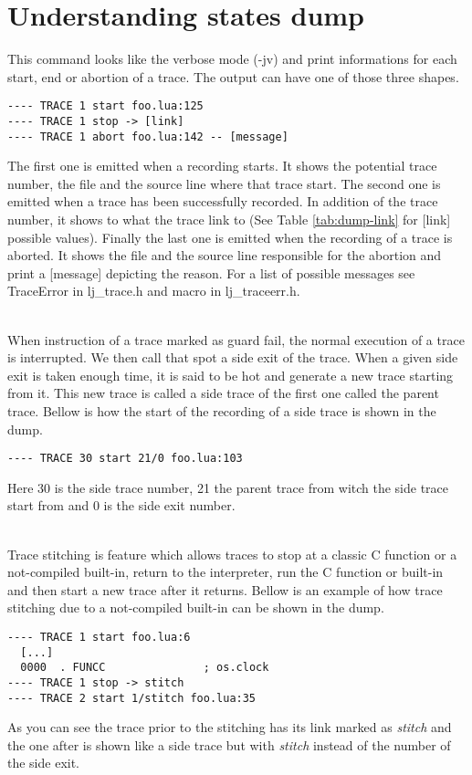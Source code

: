 \section{Understanding states dump}
\label{Sec:dump-states}
This command looks like the verbose mode (-jv) and print informations for each start,
end or abortion of a trace. The output can have one of those three shapes.
\begin{verbatim}
---- TRACE 1 start foo.lua:125
---- TRACE 1 stop -> [link]
---- TRACE 1 abort foo.lua:142 -- [message]
\end{verbatim}
The first one is emitted when a recording starts. It shows the potential
trace number, the file and the source line where that trace start.
The second one is emitted when a trace has been successfully recorded. In
addition of the trace number, it shows to what the trace link to (See Table
\ref{tab:dump-link} for [link] possible values). Finally the last one is emitted
when the recording of a trace is aborted. It shows the file and the source line
responsible for the abortion and print a [message] depicting the reason. For
a list of possible messages see TraceError in lj\_trace.h and macro in
lj\_traceerr.h.

\\
When instruction of a trace marked as guard fail, the normal execution of a
trace is interrupted. We then call that spot a side exit of the trace. When a
given side exit is taken enough time, it is said to be hot and generate a new
trace starting from it. This new trace is called a side trace of the first one
called the parent trace. Bellow is how the start of the recording of a side
trace is shown in the dump.
\begin{verbatim}
---- TRACE 30 start 21/0 foo.lua:103
\end{verbatim}
Here 30 is the side trace number, 21 the parent trace from witch the side trace
start from and 0 is the side exit number.

\\
Trace stitching is feature which allows traces to stop at a classic C function
or a not-compiled built-in, return to the interpreter, run the C function or
built-in and then start a new trace after it returns. Bellow is an example of
how trace stitching due to a not-compiled built-in can be shown in the dump.
\begin{verbatim}
---- TRACE 1 start foo.lua:6
  [...]
  0000  . FUNCC               ; os.clock
---- TRACE 1 stop -> stitch
---- TRACE 2 start 1/stitch foo.lua:35
\end{verbatim}
As you can see the trace prior to the stitching has its link marked as
\emph{stitch} and the one after is shown like a side trace but with
\emph{stitch} instead of the number of the side exit.

